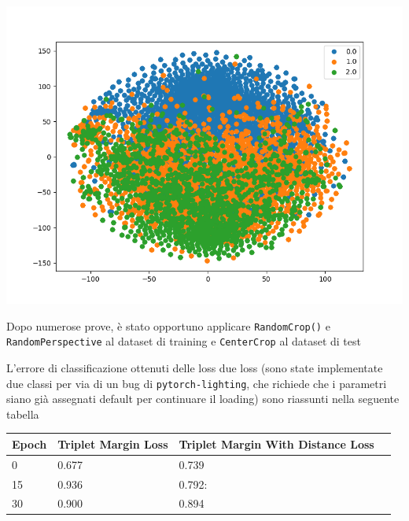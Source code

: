 \documentclass[11pt]{article}
\begin{document}
\begin{center}
\begin{minipage}{0.3\linewidth}
    \includegraphics[width=\linewidth]{09.png}
    \end{minipage}
\end{center}

Dopo numerose prove, è stato opportuno applicare \texttt{RandomCrop()} e \texttt{RandomPerspective} al dataset di training e \texttt{CenterCrop} al dataset di test

\pagebreak

L'errore di classificazione ottenuti delle loss due loss (sono state implementate due classi per via di un bug di \texttt{pytorch-lighting},
che richiede che i parametri siano già assegnati default per continuare il loading) sono riassunti nella seguente tabella

\begin{center}
    \begin{tabular}{ | l | l | l | p{5cm} |}
    \hline
    Epoch & Triplet Margin Loss & Triplet Margin With Distance Loss \\ \hline
    0 & 0.677 & 0.739 \\ \hline
    15 & 0.936 & 0.792: \\ \hline
    30 & 0.900 & 0.894  \\
    \hline
    \end{tabular}
\end{center}
\end{document}
